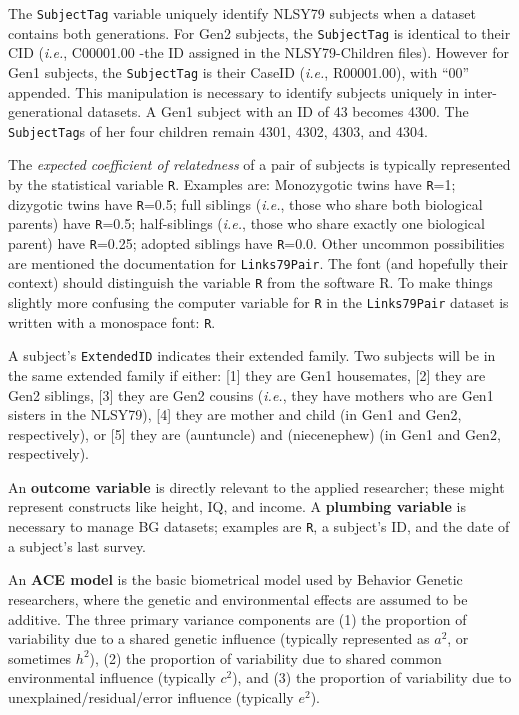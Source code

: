 \documentclass[smallextended]{svjour3}       %
\begin{document}
The \texttt{SubjectTag} variable uniquely identify NLSY79 subjects when
a dataset contains both generations. For Gen2 subjects, the
\texttt{SubjectTag} is identical to their CID (\emph{i.e.}, C00001.00
-the ID assigned in the NLSY79-Children files). However for Gen1
subjects, the \texttt{SubjectTag} is their CaseID (\emph{i.e.},
R00001.00), with ``00'' appended. This manipulation is necessary to
identify subjects uniquely in inter-generational datasets. A Gen1
subject with an ID of 43 becomes 4300. The \texttt{SubjectTag}s of her
four children remain 4301, 4302, 4303, and 4304.

The \emph{expected coefficient of relatedness} of a pair of subjects is
typically represented by the statistical variable \texttt{R}. Examples
are: Monozygotic twins have \texttt{R}=1; dizygotic twins have
\texttt{R}=0.5; full siblings (\emph{i.e.}, those who share both
biological parents) have \texttt{R}=0.5; half-siblings (\emph{i.e.},
those who share exactly one biological parent) have \texttt{R}=0.25;
adopted siblings have \texttt{R}=0.0. Other uncommon possibilities are
mentioned the documentation for \texttt{Links79Pair}. The font (and
hopefully their context) should distinguish the variable \texttt{R} from
the software R. To make things slightly more confusing the computer
variable for \texttt{R} in the \texttt{Links79Pair} dataset is written
with a monospace font: \texttt{R}.

A subject's \texttt{ExtendedID} indicates their extended family. Two
subjects will be in the same extended family if either: {[}1{]} they are
Gen1 housemates, {[}2{]} they are Gen2 siblings, {[}3{]} they are Gen2
cousins (\emph{i.e.}, they have mothers who are Gen1 sisters in the
NLSY79), {[}4{]} they are mother and child (in Gen1 and Gen2,
respectively), or {[}5{]} they are (aunt\textbar uncle) and
(niece\textbar nephew) (in Gen1 and Gen2, respectively).

An \textbf{outcome variable} is directly relevant to the applied
researcher; these might represent constructs like height, IQ, and
income. A \textbf{plumbing variable} is necessary to manage BG datasets;
examples are \texttt{R}, a subject's ID, and the date of a subject's
last survey.

An \textbf{ACE model} is the basic biometrical model used by Behavior
Genetic researchers, where the genetic and environmental effects are
assumed to be additive. The three primary variance components are (1)
the proportion of variability due to a shared genetic influence
(typically represented as \(a^2\), or sometimes \(h^2\)), (2) the
proportion of variability due to shared common environmental influence
(typically \(c^2\)), and (3) the proportion of variability due to
unexplained/residual/error influence (typically \(e^2\)).
\end{document}
